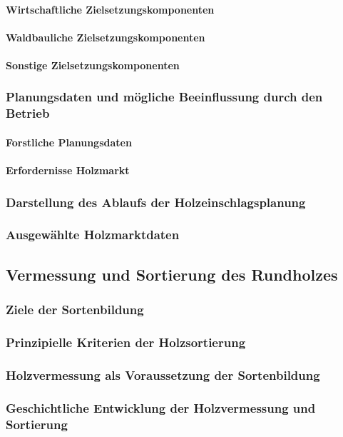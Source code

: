\documentclass{article}
\begin{document}
\paragraph{Wirtschaftliche Zielsetzungskomponenten}
\paragraph{Waldbauliche Zielsetzungskomponenten}
\paragraph{Sonstige Zielsetzungskomponenten}
\subsubsection{Planungsdaten und mögliche Beeinflussung durch den Betrieb}
\paragraph{Forstliche Planungsdaten}
\paragraph{Erfordernisse Holzmarkt}
\subsubsection{Darstellung des Ablaufs der Holzeinschlagsplanung}
\subsubsection{Ausgewählte Holzmarktdaten}
\subsection{Vermessung und Sortierung des Rundholzes}
\subsubsection{Ziele der Sortenbildung}
\subsubsection{Prinzipielle Kriterien der Holzsortierung}
\subsubsection{Holzvermessung als Voraussetzung der Sortenbildung}
\subsubsection{Geschichtliche Entwicklung der Holzvermessung und Sortierung}
\end{document}
